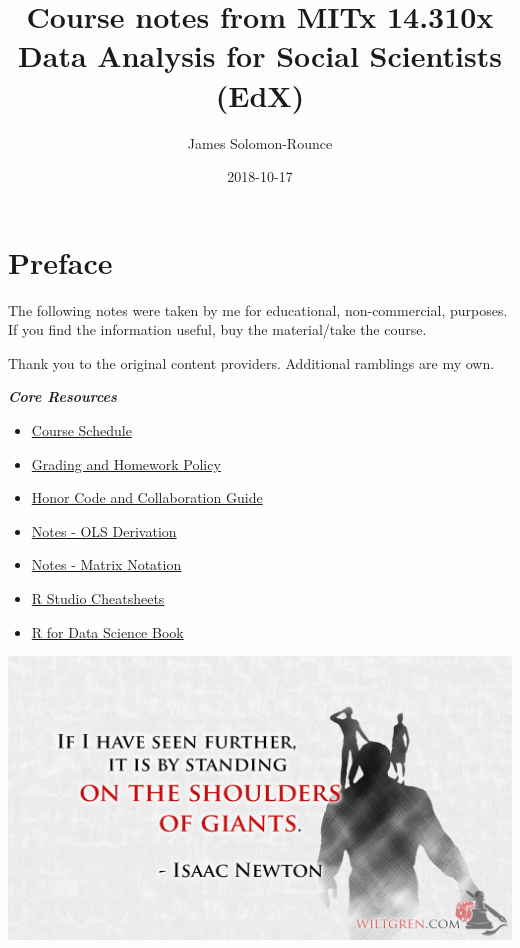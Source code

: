 \documentclass[]{book}
\title{Course notes from MITx 14.310x Data Analysis for Social Scientists (EdX)}
\author{James Solomon-Rounce}
\date{2018-10-17}
\providecommand{\tightlist}{%
  \setlength{\itemsep}{0pt}\setlength{\parskip}{0pt}}
\theoremstyle{definition}
\theoremstyle{definition}
\theoremstyle{definition}
\theoremstyle{remark}
\begin{document}
\maketitle

{
\setcounter{tocdepth}{1}
\tableofcontents
}
\chapter*{Preface}\label{preface}

The following notes were taken by me for educational, non-commercial,
purposes. If you find the information useful, buy the material/take the
course.

Thank you to the original content providers. Additional ramblings are my
own.

\textbf{\emph{Core Resources}}

\begin{itemize}
\tightlist
\item
  \href{./files/14.310x_3T2018_Schedule.pdf}{Course Schedule}
\item
  \href{./files/14.310x_Grading_and_Homework_Policy__3T2018.pdf}{Grading
  and Homework Policy}
\item
  \href{./files/14310x_Honor_Code_and_Collaboration_Guidelines.pdf}{Honor
  Code and Collaboration Guide}
\item
  \href{./files/Derivation_of_OLS_Estimators.pdf}{Notes - OLS
  Derivation}
\item
  \href{./files/Matrix_Notation_etc.pdf}{Notes - Matrix Notation}
\item
  \href{https://www.rstudio.com/resources/cheatsheets/}{R Studio
  Cheatsheets}
\item
  \href{http://r4ds.had.co.nz/index.html}{R for Data Science Book}
\end{itemize}

\includegraphics[width=1\linewidth]{images/standing}
\end{document}
